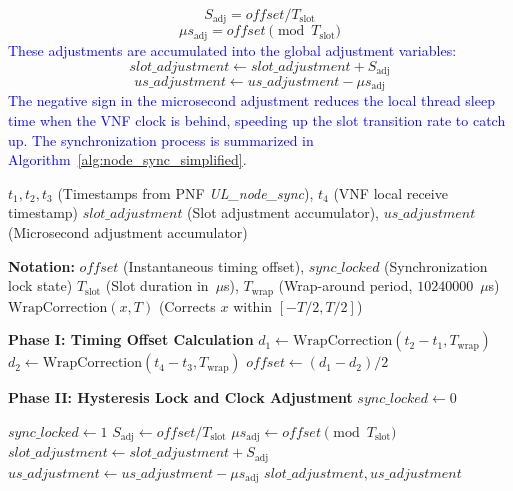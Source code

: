 \documentclass[10pt, conference, letterpaper]{IEEEtran}
\begin{document}
\begin{equation}
S_{\mathrm{adj}} = \mathit{offset} / T_{\mathrm{slot}}
\end{equation}
\begin{equation}
\mu s_{\mathrm{adj}} = \mathit{offset} \pmod{T_{\mathrm{slot}}}
\end{equation}
\textcolor{blue}{These adjustments are accumulated into the global adjustment variables:}
\begin{equation}
\mathit{slot\_adjustment} \gets \mathit{slot\_adjustment} + S_{\mathrm{adj}}
\end{equation}
\begin{equation}
\mathit{us\_adjustment} \gets \mathit{us\_adjustment} - \mu s_{\mathrm{adj}}
\end{equation}
\textcolor{blue}{The negative sign in the microsecond adjustment reduces the local thread sleep time when the VNF clock is behind, speeding up the slot transition rate to catch up. The synchronization process is summarized in Algorithm~\ref{alg:node_sync_simplified}.}

\begin{algorithm}
\caption{Node sync}
\label{alg:node_sync_simplified}
\begin{algorithmic}[1]
\algrenewcommand{}
\algrenewcommand{}
\Require $t_1, t_2, t_3$ (Timestamps from PNF \textit{UL\_node\_sync}), $t_4$ (VNF local receive timestamp)
\Ensure $\mathit{slot\_adjustment}$ (Slot adjustment accumulator), $\mathit{us\_adjustment}$ (Microsecond adjustment accumulator)

\Statex \textbf{Notation:} 
\Statex $\mathit{offset}$ (Instantaneous timing offset), $\mathit{sync\_locked}$ (Synchronization lock state)
\Statex $T_{\mathrm{slot}}$ (Slot duration in~$\mu$s), $T_{\mathrm{wrap}}$ (Wrap-around period, $10240000$~$\mu$s)
\Statex $\text{WrapCorrection}(x, T)$ (Corrects $x$ within $[-T/2, T/2]$)

\Statex \textbf{Phase I: Timing Offset Calculation}
\State $d_1 \gets \text{WrapCorrection}(t_2 - t_1, T_{\mathrm{wrap}})$
\State $d_2 \gets \text{WrapCorrection}(t_4 - t_3, T_{\mathrm{wrap}})$
\State $\mathit{offset} \gets (d_1 - d_2) / 2$

\Statex \textbf{Phase II: Hysteresis Lock and Clock Adjustment}
    \State $\mathit{sync\_locked} \gets 0$ 
\EndIf

        \State $\mathit{sync\_locked} \gets 1$ 
    \Else
        \State $S_{\mathrm{adj}} \gets \mathit{offset} / T_{\mathrm{slot}}$ 
        \State $\mu s_{\mathrm{adj}} \gets \mathit{offset} \pmod{T_{\mathrm{slot}}}$
        \State $\mathit{slot\_adjustment} \gets \mathit{slot\_adjustment} + S_{\mathrm{adj}}$
        \State $\mathit{us\_adjustment} \gets \mathit{us\_adjustment} - \mu s_{\mathrm{adj}}$
    \EndIf
\EndIf
\State \Return $\mathit{slot\_adjustment}, \mathit{us\_adjustment}$
\end{algorithmic}
\end{algorithm}
\end{document}
